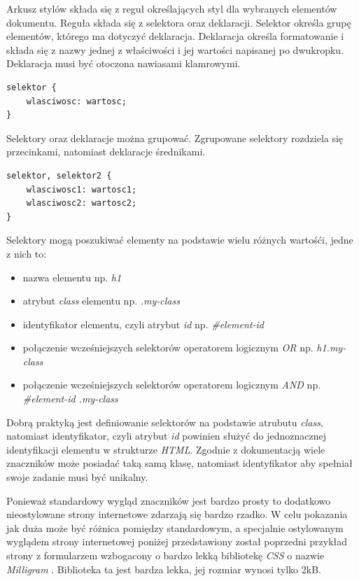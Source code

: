 \documentclass[polish, twoside, 12pt]{mwart}
\begin{document}
Arkusz stylów składa się z reguł określających styl dla wybranych elementów dokumentu. Reguła składa się z selektora oraz deklaracji. Selektor określa grupę elementów, którego ma dotyczyć deklaracja. Deklaracja określa formatowanie i składa się z nazwy jednej z właściwości i jej wartości napisanej po dwukropku. Deklaracja musi być otoczona nawiasami klamrowymi.

\begin{lstlisting}
selektor { 
	wlasciwosc: wartosc; 
}
\end{lstlisting}

Selektory oraz deklaracje można grupować. Zgrupowane selektory rozdziela się przecinkami, natomiast deklaracje średnikami.

\begin{lstlisting}
selektor, selektor2 { 
	wlasciwosc1: wartosc1;
	wlasciwosc2: wartosc2;
}
\end{lstlisting}

Selektory mogą poszukiwać elementy na podstawie wielu różnych wartośći, jedne z nich to:

\begin{itemize}
  \item nazwa elementu np. \emph{h1}
  \item atrybut \emph{class} elementu np. \emph{.my-class}
  \item identyfikator elementu, czyli atrybut \emph{id} np. \emph{\#element-id}
  \item połączenie wcześniejszych selektorów operatorem logicznym \emph{OR} np. \emph{h1.my-class}
  \item połączenie wcześniejszych selektorów operatorem logicznym \emph{AND} np. \emph{\#element-id .my-class}
\end{itemize}

Dobrą praktyką jest definiowanie selektorów na podstawie atrubutu \emph{class}, natomiast identyfikator, czyli atrybut \emph{id} powinien służyć do jednoznacznej identyfikacji elementu w strukturze \emph{HTML}. Zgodnie z dokumentacją wiele znaczników może posiadać taką samą klasę, natomiast identyfikator aby spełniał swoje zadanie musi być unikalny.

Ponieważ standardowy wygląd znaczników jest bardzo prosty to dodatkowo nieostylowane strony internetowe zdarzają się bardzo rzadko. W celu pokazania jak duża może być różnica pomiędzy standardowym, a specjalnie ostylowanym wyglądem strony internetowej poniżej przedstawiony został poprzedni przykład strony z formularzem wzbogacony o bardzo lekką bibliotekę \emph{CSS} o nazwie \emph{Milligram} \cite{milligram}. Biblioteka ta jest bardza lekka, jej rozmiar wynosi tylko 2kB.
\end{document}
